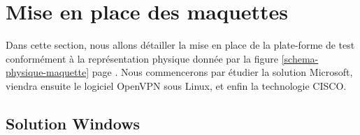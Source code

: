 \section{Mise en place des maquettes}

Dans cette section, nous allons détailler la mise en place de la plate-forme de test conformément à la représentation physique donnée par la figure \ref{schema-physique-maquette} page \pageref{schema-physique-maquette}. Nous commencerons par étudier la solution Microsoft, viendra ensuite le logiciel OpenVPN sous Linux, et enfin la technologie CISCO.

\subsection{Solution Windows}







\pagebreak
